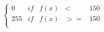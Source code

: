 \documentclass[border=2pt]{standalone}
\begin{document}
\begin{varwidth}{\linewidth}
\[
  \left \{
    \begin{array}{rrrcr}
      0 & if & f(x) & < & 150 \\
      255 & if & f(x) & >= & 150 \\
    \end{array}
  \right .
\]
\end{varwidth}
\end{document}

